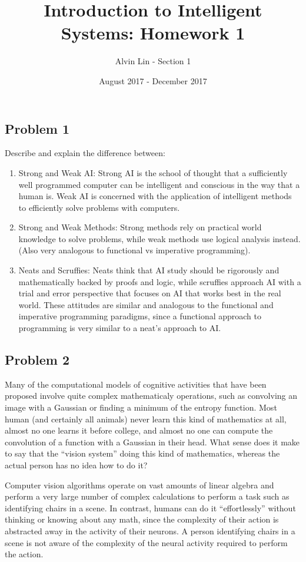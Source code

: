 \documentclass{math}
\title{Introduction to Intelligent Systems: Homework 1}
\author{Alvin Lin - Section 1}
\date{August 2017 - December 2017}
\begin{document}
\maketitle

\subsection*{Problem 1}
Describe and explain the difference between:
\begin{enumerate}
  \item Strong and Weak AI: Strong AI is the school of thought that a
  sufficiently well programmed computer can be intelligent and conscious in the
  way that a human is. Weak AI is concerned with the application of
  intelligent methods to efficiently solve problems with computers.
  \item Strong and Weak Methods: Strong methods rely on practical world
  knowledge to solve problems, while weak methods use logical analysis instead.
  (Also very analogous to functional vs imperative programming).
  \item Neats and Scruffies: Neats think that AI study should be rigorously
  and mathematically backed by proofs and logic, while scruffies approach AI
  with a trial and error perspective that focuses on AI that works best in the
  real world. These attitudes are similar and analogous to the functional and
  imperative programming paradigms, since a functional approach to programming
  is very similar to a neat's approach to AI.
\end{enumerate}

\subsection*{Problem 2}
Many of the computational models of cognitive activities that have been
proposed involve quite complex mathematicaly operations, such as convolving an
image with a Gaussian or finding a minimum of the entropy function. Most human
(and certainly all animals) never learn this kind of mathematics at all, almost
no one learns it before college, and almost no one can compute the convolution
of a function with a Gaussian in their head. What sense does it make to say that
the ``vision system'' doing this kind of mathematics, whereas the actual person
has no idea how to do it?
\par Computer vision algorithms operate on vast amounts of linear algebra and
perform a very large number of complex calculations to perform a task such as
identifying chairs in a scene. In contrast, humans can do it ``effortlessly''
without thinking or knowing about any math, since the complexity of their
action is abstracted away in the activity of their neurons. A person identifying
chairs in a scene is not aware of the complexity of the neural activity
required to perform the action.
\end{document}
